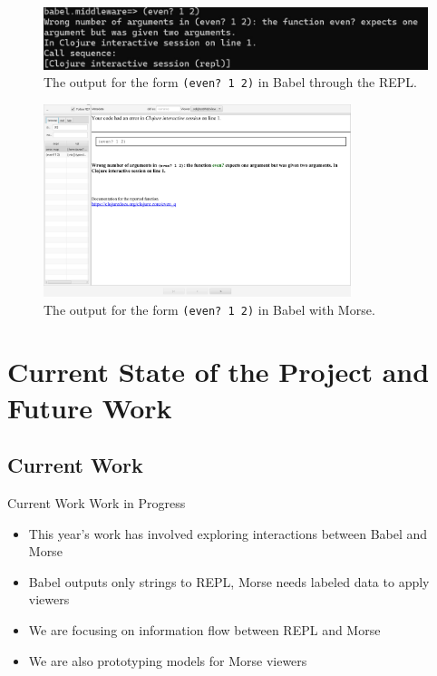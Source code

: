 \documentclass{beamer}
\begin{document}
\begin{frame}
  \begin{figure}
    \centering
    \includegraphics[width=\textwidth, height=0.25\textheight]{../resources/BabelREPL.jpg}
    \caption{The output for the form \texttt{(even?~1~2)} in Babel through the REPL. }
    \label{fig:BabelREPL}
  \end{figure}
\end{frame}

\begin{frame}
  \begin{figure}
    \centering
    \includegraphics[width=0.8\textwidth]{../resources/BabelViewerExample.png}
    \caption{The output for the form \texttt{(even? 1 2)} in Babel with Morse.}
    \label{fig:defaultclj}
  \end{figure}
\end{frame}

\section{Current State of the Project and Future Work}
\subsection{Current Work}
\begin{frame}{Current Work}
  Work in Progress
  \begin{itemize}
    \item This year's work has involved exploring interactions between Babel and Morse
    \item Babel outputs only strings to REPL, Morse needs labeled data to apply viewers
    \item We are focusing on information flow between REPL and Morse
    \item We are also prototyping models for Morse viewers
  \end{itemize}
\end{frame}
\end{document}
